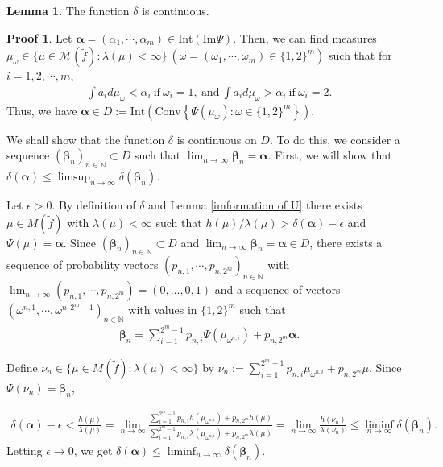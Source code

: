 \documentclass{article}
\theoremstyle{definition}
\newtheorem{lemma}[thm]{Lemma}
\newtheorem*{pf}{Proof}
\begin{document}
\begin{lemma}\label{continuity of delta}
The function $\delta$ is continuous.    
\end{lemma}
\begin{pf}
Let $\boldsymbol{\alpha}=(\alpha_1,\cdots,\alpha_m)\in \text{Int}(\text{Im}\Psi)$. Then, we can find measures $\mu_{\omega}\in\lbrace \mu \in \mathcal{M}({\tilde f}): \lambda(\mu)<\infty \rbrace \ (\omega=(\omega_1,\cdots,\omega_m)\in\lbrace1,2\rbrace^m)$ such that for $i=1,2,\cdots,m$,
\begin{align}
    \int a_i d\mu_\omega<\alpha_i\ \text{if}\ \omega_i=1,\ \text{and}\ 
    \int a_i d\mu_\omega>\alpha_i\ \text{if}\ \omega_i=2.\nonumber
\end{align}
Thus, we have $\boldsymbol{\alpha}\in D:=\text{Int}\left(\text{Conv}\left\{\Psi(\mu_{\omega}):\omega\in\lbrace1,2\rbrace^m\right\}\right)$.  

We shall show that the function $\delta$ is continuous on $D$. To do this, we consider a sequence $(\boldsymbol{\beta}_n)_{n\in\mathbb{N}}\subset D$ such that $\lim_{n\to\infty}\boldsymbol{\beta}_n=\boldsymbol{\alpha}$. First, we will show that 
$\delta(\boldsymbol{\alpha})\leq\limsup_{n\to\infty}\delta(\boldsymbol{\beta}_n)$.

Let $\epsilon>0$. By definition of $\delta$ and Lemma \ref{imformation of U} there exists $ \mu \in {M}({\tilde f})$ with $\lambda(\mu)<\infty$ such that $h(\mu)/\lambda(\mu)>\delta(\boldsymbol{\alpha})-\epsilon$ and $\Psi(\mu)=\boldsymbol{\alpha}$. Since $(\boldsymbol{\beta}_n)_{n\in\mathbb{N}}\subset D$ and $\lim_{n\to\infty}\boldsymbol{\beta}_n=\boldsymbol{\alpha}\in D$, there exists a sequence  
of probability vectors $(p_{n,1},\cdots,p_{n,2^m})_{n\in \mathbb{N}}$ with $\lim_{n\to\infty} (p_{n,1},\cdots,p_{n,2^m})= (0,\dots ,0,1)$ and a sequence of vectors  $(\omega^{n,1},\cdots,\omega^{n,2^m-1})_{n\in \mathbb{N}}$ with values in $\lbrace1,2\rbrace^m$ 
 such that
\begin{align}   \boldsymbol{\beta}_n=\sum_{i=1}^{2^m-1}p_{n,i}\Psi(\mu_{\omega^{n,i}})+p_{n,2^m}\boldsymbol{\alpha}.\nonumber
\end{align}

Define $\nu_n\in\lbrace \mu \in {M}({\tilde f}): \lambda(\mu)<\infty \rbrace$ by $\nu_n:=\sum_{i=1}^{2^m-1}p_{n,i}\mu_{\omega^{n,i}}+p_{n,2^m}\mu$. Since  
$\Psi(\nu_n)=\boldsymbol{\beta}_n$, 

\begin{align}
    \delta(\boldsymbol{\alpha})-\epsilon<\frac{h(\mu)}{\lambda(\mu)}
    =\lim_{n\to\infty}\frac{\sum_{i=1}^{2^m-1}p_{n,i}h(\mu_{\omega^{n,i}})+p_{n,2^m}h(\mu)}{\sum_{i=1}^{2^m-1}p_{n,i}\lambda(\mu_{\omega^{n,i}})+p_{n,2^m}\lambda(\mu)}\nonumber=\lim_{n\to\infty}\frac{h(\nu_n)}{\lambda(\nu_n)}\leq\liminf_{n\to\infty}\delta(\boldsymbol{\beta}_n).\nonumber
\end{align}
Letting $\epsilon\rightarrow0$, we get $\delta(\boldsymbol{\alpha})\leq\liminf_{n\to\infty}\delta(\boldsymbol{\beta}_n)$.



\end{pf}
\end{document}
